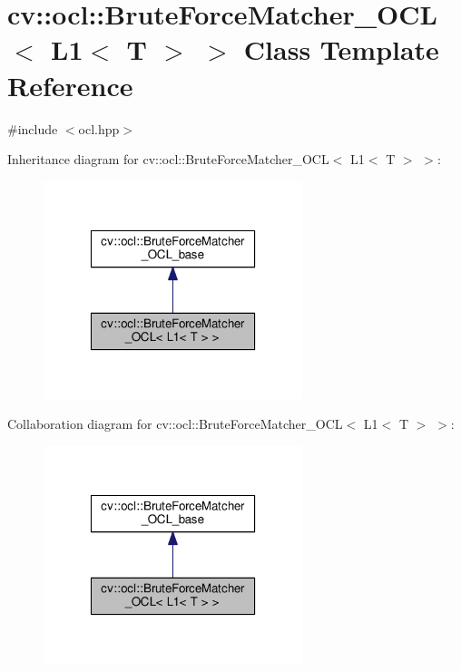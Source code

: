 \hypertarget{classcv_1_1ocl_1_1BruteForceMatcher__OCL_3_01L1_3_01T_01_4_01_4}{\section{cv\-:\-:ocl\-:\-:Brute\-Force\-Matcher\-\_\-\-O\-C\-L$<$ L1$<$ T $>$ $>$ Class Template Reference}
\label{classcv_1_1ocl_1_1BruteForceMatcher__OCL_3_01L1_3_01T_01_4_01_4}
}


{\ttfamily \#include $<$ocl.\-hpp$>$}



Inheritance diagram for cv\-:\-:ocl\-:\-:Brute\-Force\-Matcher\-\_\-\-O\-C\-L$<$ L1$<$ T $>$ $>$\-:\nopagebreak
\begin{figure}[H]
\begin{center}
\leavevmode
\includegraphics[width=214pt]{classcv_1_1ocl_1_1BruteForceMatcher__OCL_3_01L1_3_01T_01_4_01_4__inherit__graph}
\end{center}
\end{figure}


Collaboration diagram for cv\-:\-:ocl\-:\-:Brute\-Force\-Matcher\-\_\-\-O\-C\-L$<$ L1$<$ T $>$ $>$\-:\nopagebreak
\begin{figure}[H]
\begin{center}
\leavevmode
\includegraphics[width=214pt]{classcv_1_1ocl_1_1BruteForceMatcher__OCL_3_01L1_3_01T_01_4_01_4__coll__graph}
\end{center}
\end{figure}
